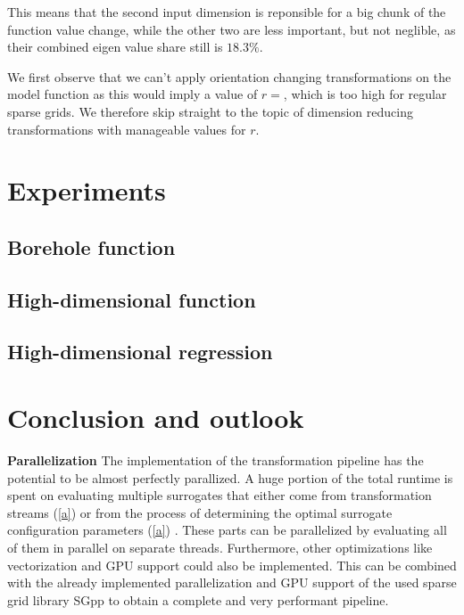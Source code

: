 \documentclass[
  a4paper,  %
  twoside,  %
  bibliography=totoc,
  headsepline,
  cleardoublepage=empty,
  parskip=half,
  draft=false
]{scrbook}
\begin{document}
This means that the second input dimension is reponsible for a big chunk of the function value change, while the other two  are less important, but not neglible, as their combined eigen value share still is $18.3\%$.

We first observe that we can't apply orientation changing transformations on the model function as this would imply a value of $r=$, which is too high for regular sparse grids.
We therefore skip straight to the topic of dimension reducing transformations with manageable values for $r$.

\chapter{Experiments}
\label{chap:c8}

\section{Borehole function}
\section{High-dimensional function}
\section{High-dimensional regression}

\chapter{Conclusion and outlook}
\label{chap:c9}

\vspace{1em}
\textbf{Parallelization}
The implementation of the transformation pipeline has the potential to be almost perfectly parallized.
A huge portion of the total runtime is spent on evaluating multiple surrogates that either come from transformation streams (\cref{a}) or from the process of determining the optimal surrogate configuration parameters (\cref{a}) .
These parts can be parallelized by evaluating all of them in parallel on separate threads.
Furthermore, other optimizations like vectorization and GPU support could also be implemented.
This can be combined with the already implemented parallelization and GPU support of the used sparse grid library SGpp to obtain a complete and very performant pipeline.
\end{document}
